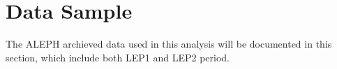 \section{Data Sample}

The ALEPH archieved data used in this analysis will be documented in this section, which include both LEP1 and LEP2 period.

